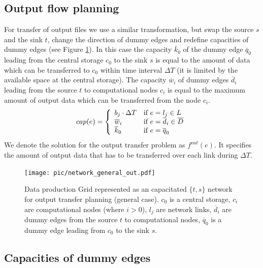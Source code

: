 \documentclass{svjour3}                     %
\begin{document}
\subsection{Output flow planning}
\label{outproblem}
For transfer of output files we use a similar transformation, but swap the
source $s$ and the sink $t$, change the direction of dummy edges and redefine
capacities of dummy edges (see Figure \ref{general_out}). In this case the capacity $\overline{k}_{0}$ of the
dummy edge $\overline{q}_{0}$ leading from the central storage $c_0$ to the
sink $s$ is equal to the amount of data which can be transferred to $c_0$
within time interval $\Delta T$ (it is limited by the available space at the
central storage). The capacity $\overline{w}_{i}$ of dummy edges
$\overline{d}_{i}$ leading from the source $t$ to computational nodes $c_{i}$
is equal to the maximum amount of output data which can be transferred from
the node $c_{i}$.
%
\begin{equation}
\label{edge_cap_out}
cap(e) = \left\{ 
  \begin{array}{l l}
    b_{j} \cdot \Delta T & \text{if }e = l_{j} \in L \\
    \overline{w}_{i} & \text{if } e = \overline{d}_{i} \in \overline{D}\\
    \overline{k}_{0} & \text{if } e = \overline{q}_{0}
  \end{array} \right.
\end{equation}
%
We denote the solution for the output transfer problem as $f^{out}(e)$. It specifies the amount of output data that has to be transferred over each link during $\Delta T$.
\begin{figure}[b]
	\begin{center}
		\texttt{[image: pic/network\_general\_out.pdf]}
	\end{center}
	\caption{Data production Grid represented as an capacitated $\{t,s\}$ network for output transfer planning (general case). $c_{0}$ is a central storage, $c_{i}$ are computational nodes (where $i>0$), $l_{j}$ are network links, $\overline{d}_{i}$ are dummy edges from the source $t$ to computational nodes, $\overline{q}_{0}$ is a dummy edge leading from $c_{0}$ to the sink $s$. }
	\label{general_out}	
\end{figure}

\subsection{Capacities of dummy edges}
\end{document}
